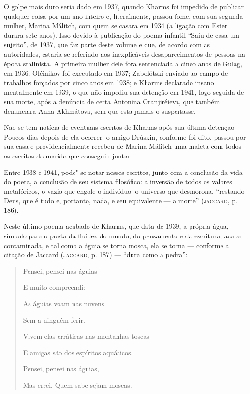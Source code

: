 O golpe mais duro seria dado em 1937, quando Kharms foi impedido de
publicar qualquer coisa por um ano inteiro e, literalmente, passou fome,
com sua segunda mulher, Marina Málitch, com quem se casara em 1934 (a
ligação com Ester durara sete anos). Isso devido à publicação do poema
infantil ``Saiu de casa um sujeito'', de 1937, que faz parte deste
volume e que, de acordo com as autoridades, estaria se referindo aos
inexplicáveis desaparecimentos de pessoas na época stalinista. A
primeira mulher dele fora sentenciada a cinco anos de Gulag, em 1936;
Oléinikov foi executado em 1937; Zabolótski enviado ao campo de
trabalhos forçados por cinco anos em 1938; e Kharms declarado insano
mentalmente em 1939, o que não impediu sua detenção em 1941, logo
seguida de sua morte, após a denúncia de certa Antonina Oranjiréieva,
que também denunciara Anna Akhmátova, sem que esta jamais o suspeitasse.

Não se tem notícia de eventuais escritos de Kharms após sua última
detenção. Poucos dias depois de ela ocorrer, o amigo Drúskin, conforme
foi dito, passou por sua casa e providencialmente recebeu de Marina
Málitch uma maleta com todos os escritos do marido que conseguiu juntar.

Entre 1938 e 1941, pode"-se notar nesses escritos, junto com a conclusão
da vida do poeta, a conclusão de seu sistema filosófico: a inversão de
todos os valores metafóricos, o vazio que engole o indivíduo, o universo
que desmorona, ``restando Deus, que é tudo e, portanto, nada, e seu
equivalente --- a morte'' (\textsc{jaccard}, p. 186).

Neste último poema acabado de Kharms, que data de 1939, a própria água,
símbolo para o poeta da fluidez do mundo, do pensamento e da escritura,
acaba contaminada, e tal como a águia se torna mosca, ela se torna ---
conforme a citação de Jaccard (\textsc{jaccard}, p. 187) --- ``dura como
a pedra'':

\begin{quote}
Pensei, pensei nas águias

E muito compreendi:

As águias voam nas nuvens

Sem a ninguém ferir.

Vivem elas erráticas nas montanhas toscas

E amigas são dos espíritos aquáticos.

Pensei, pensei nas águias,

Mas errei. Quem sabe sejam moscas.
\end{quote}


